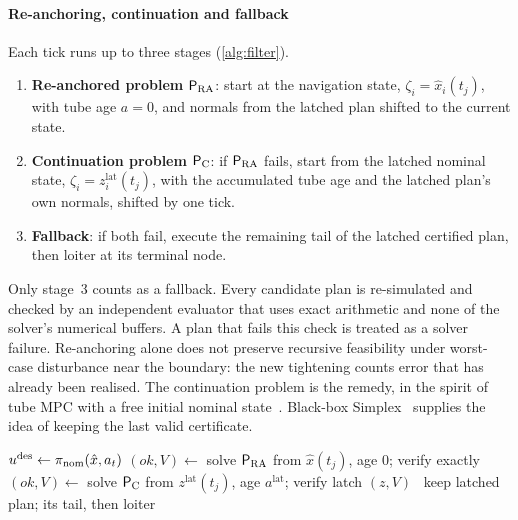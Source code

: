 \paragraph{Re-anchoring, continuation and fallback} Each tick runs up to
three stages (\cref{alg:filter}).
\begin{enumerate}
\item \textbf{Re-anchored problem} $\mathsf{P}_{\mathrm{RA}}$: start at
  the navigation state, $\zeta_i=\hat x_i(t_j)$, with tube age $a=0$, and
  normals from the latched plan shifted to the current state.
\item \textbf{Continuation problem} $\mathsf{P}_{\mathrm{C}}$: if $\mathsf{P}_{\mathrm{RA}}$ fails, start from the
  latched nominal state, $\zeta_i=z_i^{\mathrm{lat}}(t_j)$, with the
  accumulated tube age and the latched plan's own normals, shifted by one
  tick.
\item \textbf{Fallback}: if both fail, execute the remaining tail of the
  latched certified plan, then loiter at its terminal node.
\end{enumerate}
Only stage~3 counts as a fallback. Every candidate plan is re-simulated and
checked by an independent evaluator that uses exact arithmetic and none of
the solver's numerical buffers. A plan that fails this check is treated as a
solver failure. Re-anchoring alone does not preserve recursive feasibility
under worst-case disturbance near the boundary: the new tightening counts
error that has already been realised. The continuation problem is the
remedy, in the spirit of tube MPC with a free initial nominal
state~\cite{mayne2005tube}. Black-box Simplex~\cite{mehmood2022bbsimplex}
supplies the idea of keeping the last valid certificate.

\begin{algorithm}[t]
\caption{One filter tick at $t_j$ (all aircraft jointly)}\label{alg:filter}
\begin{algorithmic}[1]
\State $u^{\mathrm{des}}\gets\pi_{\mathrm{nom}}(\hat x,a_t)$ 
\State $(\mathit{ok},V)\gets$ solve $\mathsf{P}_{\mathrm{RA}}$ from $\hat x(t_j)$, age $0$; verify exactly
  \State $(\mathit{ok},V)\gets$ solve $\mathsf{P}_{\mathrm{C}}$ from $z^{\mathrm{lat}}(t_j)$, age $a^{\mathrm{lat}}$; verify
\EndIf
{} latch $(z,V)$ 
\Else\ keep latched plan; its tail, then loiter 
\EndIf
\end{algorithmic}
\end{algorithm}

